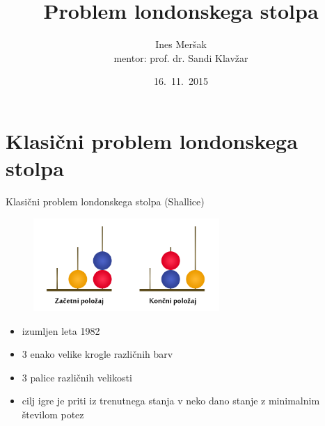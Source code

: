 \documentclass{beamer}
\title{Problem londonskega stolpa}
\author[Ines Meršak]{Ines Meršak \\[5px] mentor: prof. dr. Sandi Klavžar}
\date{16.~11.~2015}
\begin{document}
    
\begin{frame}[plain]
    \titlepage
\end{frame}


\section{Klasični problem londonskega stolpa}
\begin{frame}{Klasični problem londonskega stolpa (Shallice)}
    \begin{figure}
        \centering
        \includegraphics[height=100pt]{../img/london-tower.png}
    \end{figure}
    \begin{itemize}
        \item izumljen leta 1982
        \item 3 enako velike krogle različnih barv
        \item 3 palice različnih velikosti
        \item cilj igre je priti iz trenutnega stanja v neko dano stanje z minimalnim številom potez
    \end{itemize}
\end{frame}
\end{document}
